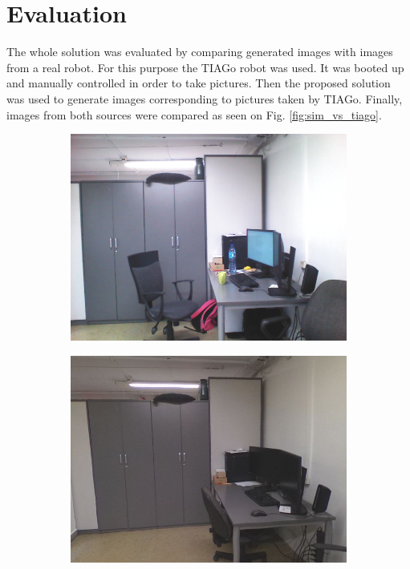 \documentclass{svproc}
\begin{document}
\section{Evaluation}

The whole solution was evaluated by comparing generated images with images from a real robot.
For this purpose the TIAGo robot was used.
It was booted up and manually controlled in order to take pictures.
Then the proposed solution was used to generate images corresponding to pictures taken by TIAGo.
Finally, images from both sources were compared as seen on Fig. \ref{fig:sim_vs_tiago}.

\begin{figure}[!ht]
    \centering
    \begin{subfigure}{0.46\textwidth}
        \centering
        \includegraphics[width=\linewidth]{img/sim_vs_tiago/tia_biurko.jpg}
        \caption{}
        \vspace*{1em}
    \end{subfigure}\hfill%
    \begin{subfigure}{0.46\textwidth}
        \centering
        \includegraphics[width=\linewidth]{img/sim_vs_tiago/sim_biurko.jpg}

\end{subfigure}
\end{figure}
\end{document}
